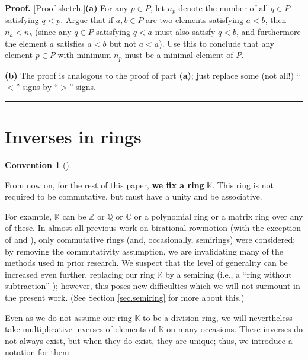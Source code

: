 \documentclass[numbers=enddot,12pt,final,onecolumn,notitlepage]{scrartcl}%
\theoremstyle{definition}
\newtheorem{conv}[theo]{Convention}
\newenvironment{convention}[1][]
{\begin{conv}[#1]\begin{leftbar}}
{\end{leftbar}\end{conv}}
\newenvironment{verlong}{}{}
\newenvironment{proof}[1][Proof]{\noindent\textbf{#1.} }{\ \rule{0.5em}{0.5em}}
\begin{document}
\begin{verlong}


\begin{proof}
[Proof sketch.]\textbf{(a)} For any $p \in P$, let $n_{p}$ denote the number
of all $q \in P$ satisfying $q < p$. Argue that if $a, b \in P$ are two
elements satisfying $a < b$, then $n_{a} < n_{b}$ (since any $q \in P$
satisfying $q < a$ must also satisfy $q < b$, and furthermore the element $a$
satisfies $a < b$ but not $a < a$). Use this to conclude that any element $p
\in P$ with minimum $n_{p}$ must be a minimal element of $P$.

\textbf{(b)} The proof is analogous to the proof of part \textbf{(a)}; just
replace some (not all!) ``$<$'' signs by ``$>$'' signs.
\end{proof}
\end{verlong}

\section{\label{sec.inverses}Inverses in rings}

\begin{convention}
From now on, for the rest of this paper, \textbf{we fix a ring} $\mathbb{K}$.
This ring is not required to be commutative, but must have a unity and be associative.
\end{convention}

For example, $\mathbb{K}$ can be $\mathbb{Z}$ or $\mathbb{Q}$ or $\mathbb{C}$
or a polynomial ring or a matrix ring over any of these. In almost all
previous work on birational rowmotion (with the exception of \cite{JosRob20}
and \cite{JosRob21}), only commutative rings (and, occasionally, semirings)
were considered; by removing the commutativity assumption, we are invalidating
many of the methods used in prior research. We suspect that the level of
generality can be increased even further, replacing our ring $\mathbb{K}$ by a
semiring (i.e., a \textquotedblleft ring without subtraction\textquotedblright%
); however, this poses new difficulties which we will not surmount in the
present work. (See Section \ref{sec.semiring} for more about this.)

Even as we do not assume our ring $\mathbb{K}$ to be a division ring, we will
nevertheless take multiplicative inverses of elements of $\mathbb{K}$ on many
occasions. These inverses do not always exist, but when they do exist, they
are unique; thus, we introduce a notation for them:
\end{document}
